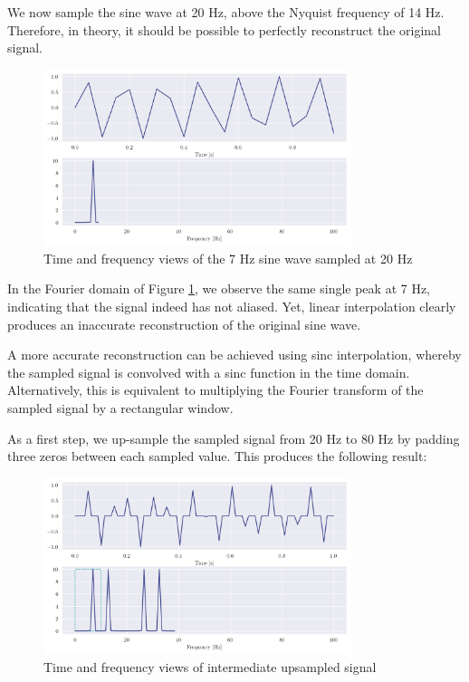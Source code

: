 \documentclass[a4paper, 11pt]{article}
\begin{document}
We now sample the sine wave at 20 Hz, above the Nyquist frequency of 14 Hz.
Therefore, in theory, it should be possible to perfectly reconstruct the
original signal.
\begin{figure}[ht]
    \centering
    \includegraphics[width=0.8\textwidth]{images/q6_sampled.png}
    \caption{Time and frequency views of the 7 Hz sine wave sampled at 20 Hz}
    \label{fig:q6_sampled}
\end{figure}

In the Fourier domain of Figure \ref{fig:q6_sampled}, we observe the same single
peak at 7 Hz, indicating that the signal indeed has not aliased. Yet, linear
interpolation clearly produces an inaccurate reconstruction of the original sine
wave.

\newpage

A more accurate reconstruction can be achieved using sinc interpolation, whereby
the sampled signal is convolved with a sinc function in the time domain.
Alternatively, this is equivalent to multiplying the Fourier transform of the
sampled signal by a rectangular window.

As a first step, we up-sample the sampled signal from 20 Hz to 80 Hz by padding
three zeros between each sampled value. This produces the following result:

\begin{figure}[ht]
    \centering
    \includegraphics[width=0.8\textwidth]{images/q6_intermediate.png}
    \caption{Time and frequency views of intermediate upsampled signal}
    \label{fig:q6_intermediate}
\end{figure}
\end{document}
